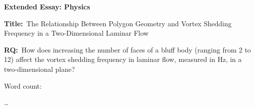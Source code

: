 \documentclass[12pt]{article}
\begin{document}
\begin{titlepage}
	\begin{center}
		\textbf{Extended Essay: Physics}
		
		\vspace*{4cm}
		
		\textbf{Title:}\
		The Relationship Between Polygon Geometry and Vortex Shedding Frequency in a Two-Dimensional Laminar Flow
		\vspace{1cm}
		
		\textbf{RQ:}\
		How does increasing the number of faces of a bluff body (ranging from 2 to 12) affect the vortex shedding frequency in laminar flow, measured in Hz, in a two-dimensional plane?
		\vspace{4cm}
		
		Word count:
		
		\ldots
		\vfill
		
		\vspace{0.1cm}
	\end{center}
\end{titlepage}
	
	
\tableofcontents
\newpage
	







\printbibliography

\clearpage

\appendix
{}



	
\end{document}
